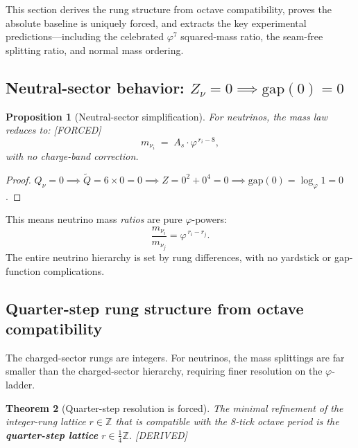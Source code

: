 \documentclass[11pt,a4paper]{article}
\newtheorem{theorem}{Theorem}[section]
\newtheorem{proposition}[theorem]{Proposition}
\theoremstyle{definition}
\theoremstyle{remark}
\newcommand{\phig}{\varphi}
\newcommand{\tildeQ}{\tilde{Q}}
\newcommand{\Zidx}{Z}
\newcommand{\DERIVED}{\textcolor{blue!70!black}{\footnotesize\textsf{[DERIVED]}}}
\newcommand{\FORCED}{\textcolor{red!70!black}{\footnotesize\textsf{[FORCED]}}}
\begin{document}
This section derives the rung structure from octave compatibility, proves the
absolute baseline is uniquely forced, and extracts the key experimental
predictions---including the celebrated $\phig^7$ squared-mass ratio, the
seam-free splitting ratio, and normal mass ordering.

\subsection{Neutral-sector behavior: $\Zidx_\nu = 0 \implies \mathrm{gap}(0) = 0$}

\begin{proposition}[Neutral-sector simplification]
\label{prop:gap_zero}
For neutrinos, the mass law reduces to: \FORCED{}
\begin{equation}
  m_{\nu_i} \;=\; A_s \cdot \phig^{\,r_i - 8},
  \label{eq:nu_mass_law}
\end{equation}
with no charge-band correction.
\end{proposition}

\begin{proof}
$Q_\nu = 0 \implies \tildeQ = 6 \times 0 = 0 \implies
\Zidx = 0^2 + 0^4 = 0 \implies \mathrm{gap}(0) = \log_\phig 1 = 0$.
\end{proof}

\noindent
This means neutrino mass \emph{ratios} are pure $\phig$-powers:
\begin{equation}
  \frac{m_{\nu_i}}{m_{\nu_j}} = \phig^{\,r_i - r_j}.
  \label{eq:nu_ratio}
\end{equation}
The entire neutrino hierarchy is set by rung differences, with no yardstick
or gap-function complications.

\subsection{Quarter-step rung structure from octave compatibility}

The charged-sector rungs are integers.  For neutrinos, the mass splittings
are far smaller than the charged-sector hierarchy, requiring finer resolution
on the $\phig$-ladder.

\begin{theorem}[Quarter-step resolution is forced]
\label{thm:quarter_step}
The minimal refinement of the integer-rung lattice $r \in \mathbb{Z}$ that is
compatible with the 8-tick octave period is the \textbf{quarter-step lattice}
$r \in \tfrac{1}{4}\mathbb{Z}$.  \DERIVED{}
\end{theorem}
\end{document}
